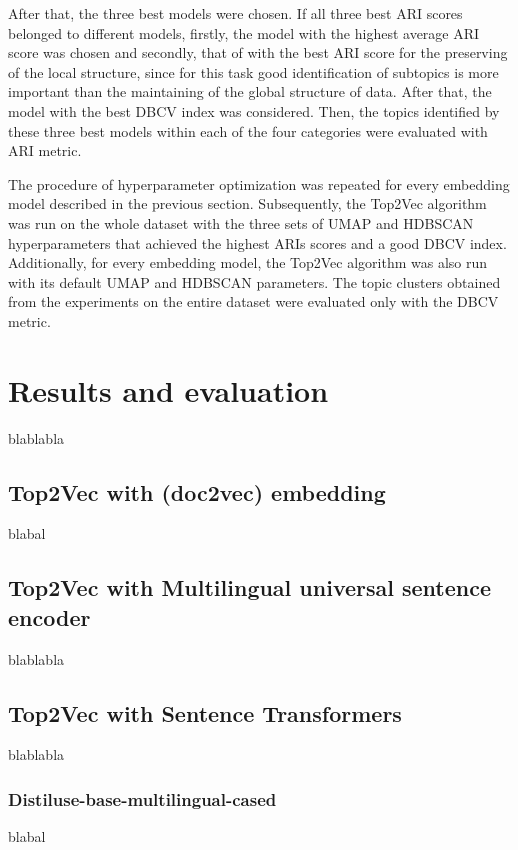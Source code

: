 \documentclass[fontsize=12pt,a4paper,twoside,openany]{scrbook}
\begin{document}
After that, the three best models were chosen. If all three best ARI scores belonged to different models, firstly, the model with the highest average ARI score was chosen and secondly, that of with the best ARI score for the preserving of the local structure, since for this task good identification of subtopics is more important than the maintaining of the global structure of data. After that, the model with the best DBCV index was considered. Then, the topics identified by these three best models within each of the four categories were evaluated with ARI metric.

The procedure of hyperparameter optimization was repeated for every embedding model described in the previous section. Subsequently, the Top2Vec algorithm was run on the whole dataset with the three sets of UMAP and HDBSCAN hyperparameters that achieved the highest ARIs scores and a good DBCV index. Additionally, for every embedding model, the Top2Vec algorithm was also run with its default UMAP and HDBSCAN parameters. The topic clusters obtained from the experiments on the entire dataset were evaluated only with the DBCV metric.



\chapter{Results and evaluation}

blablabla

\section{Top2Vec with (doc2vec) embedding}
\label{sec:doc2vec_results}
blabal

\section{Top2Vec with Multilingual universal sentence encoder}
\label{sec:muse_results}

blablabla

\section{Top2Vec with Sentence Transformers}
\label{sec:senttrans_results}
blablabla


\subsection{Distiluse-base-multilingual-cased}
\label{sec:muse_result}
blabal
\end{document}

